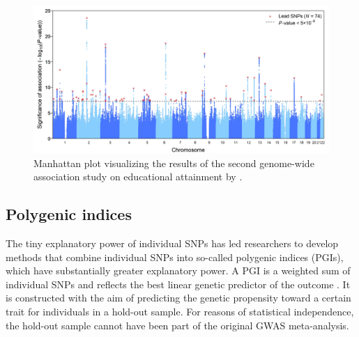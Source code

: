 \documentclass[12pt,a4paper]{article}
\begin{document}
\begin{bibunit}
\begin{figure}
    \centering
    \includegraphics[width=14cm]{include/Manhattan_plot_EA2_EduYears_Pooled_Main_GxEpaper.jpg}
    \caption{Manhattan plot visualizing the results of the second genome-wide association study on educational attainment by \cite{okbay2016}.}
    \label{fig:manhattan}
\end{figure}

\subsection{Polygenic indices}
\label{sec:polygenicindices}
The tiny explanatory power of individual SNPs has led researchers to develop methods that combine individual SNPs into so-called polygenic indices (PGIs), which have substantially greater explanatory power. A PGI is a weighted sum of individual SNPs and reflects the best linear genetic predictor of the outcome \citep[e.g.,][]{Mills2020book,Becker2021}. It is constructed with the aim of predicting the genetic propensity toward a certain trait for individuals in a hold-out sample. For reasons of statistical independence, the hold-out sample cannot have been part of the original GWAS meta-analysis. 


\end{bibunit}
\end{document}

